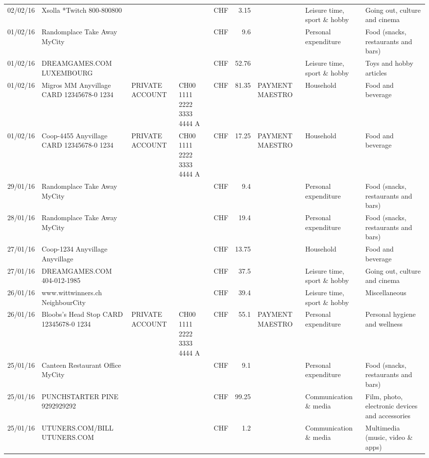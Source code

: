 \begin{landscape}
\begin{table}[h]
\begin{center}
\begin{tabular}{rllllrlll}
		02/02/16 & Xsolla *Twitch           800-800800 &       &       & CHF   & 3.15  &       & Leisure time, sport \& hobby & Going out, culture and cinema \\
		01/02/16 & Randomplace Take Away     MyCity &       &       & CHF   & 9.6   &       & Personal expenditure & Food (snacks, restaurants and bars) \\
		01/02/16 & DREAMGAMES.COM           LUXEMBOURG &       &       & CHF   & 52.76 &       & Leisure time, sport \& hobby & Toys and hobby articles \\
		01/02/16 & Migros MM Anyvillage CARD 12345678-0 1234 & PRIVATE ACCOUNT & CH00 1111 2222 3333 4444 A & CHF   & 81.35 & PAYMENT MAESTRO & Household & Food and beverage \\
		01/02/16 & Coop-4455 Anyvillage CARD 12345678-0 1234 & PRIVATE ACCOUNT & CH00 1111 2222 3333 4444 A & CHF   & 17.25 & PAYMENT MAESTRO & Household & Food and beverage \\
		29/01/16 & Randomplace Take Away     MyCity &       &       & CHF   & 9.4   &       & Personal expenditure & Food (snacks, restaurants and bars) \\
		28/01/16 & Randomplace Take Away     MyCity &       &       & CHF   & 19.4  &       & Personal expenditure & Food (snacks, restaurants and bars) \\
		27/01/16 & Coop-1234 Anyvillage    Anyvillage &       &       & CHF   & 13.75 &       & Household & Food and beverage \\
		27/01/16 & DREAMGAMES.COM           404-012-1985 &       &       & CHF   & 37.5  &       & Leisure time, sport \& hobby & Going out, culture and cinema \\
		26/01/16 & www.wittwinners.ch        NeighbourCity &       &       & CHF   & 39.4  &       & Leisure time, sport \& hobby & Miscellaneous \\
		26/01/16 & Bloobs's Head Stop CARD 12345678-0 1234 & PRIVATE ACCOUNT & CH00 1111 2222 3333 4444 A & CHF   & 55.1  & PAYMENT MAESTRO & Personal expenditure & Personal hygiene and wellness \\
		25/01/16 & Canteen Restaurant Office      MyCity &       &       & CHF   & 9.1   &       & Personal expenditure & Food (snacks, restaurants and bars) \\
		25/01/16 & PUNCHSTARTER PINE   9292929292 &       &       & CHF   & 99.25 &       & Communication \& media & Film, photo, electronic devices and accessories \\
		25/01/16 & UTUNERS.COM/BILL          UTUNERS.COM &       &       & CHF   & 1.2   &       & Communication \& media & Multimedia (music, video \& apps) \\

\end{tabular}
\end{center}
\end{table}
\end{landscape}

